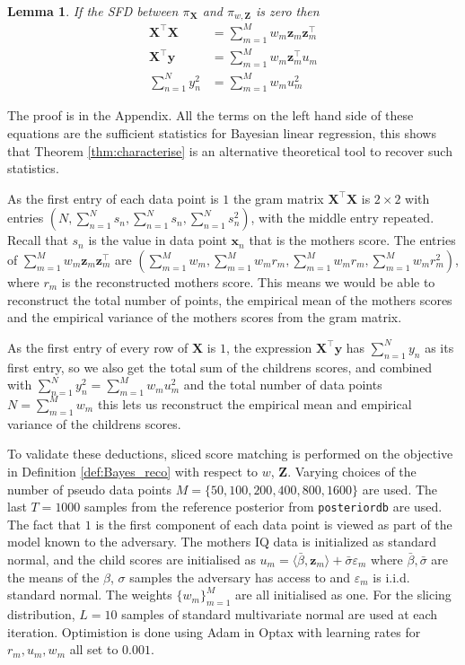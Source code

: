 \documentclass[hyperref]{article}
\theoremstyle{plain}
\newtheorem{lemma}[theorem]{Lemma}
\theoremstyle{remark}
\newcommand{\bx}{\mathbf{x}}
\newcommand{\by}{\mathbf{y}}
\newcommand{\bz}{\mathbf{z}}
\newcommand{\bX}{\mathbf{X}}
\newcommand{\bZ}{\mathbf{Z}}
\begin{document}
\begin{lemma}\label{lem:reco_vals}
	If the \emph{SFD} between $\pi_{\bX}$ and $\pi_{w,\bZ}$ is zero then 
	\begin{align*}
		\bX^{\top}\bX & = \sum_{m=1}^{M}w_{m}\bz_{m}\bz_{m}^{\top} \\
		\bX^{\top}\by & = \sum_{m=1}^{M}w_{m}\bz_{m}^{\top}u_{m} \\
		\sum_{n=1}^{N}y_{n}^{2} & = \sum_{m=1}^{M}w_{m}u_{m}^{2}
	\end{align*}
\end{lemma}

The proof is in the Appendix. All the terms on the left hand side of these equations are the sufficient statistics for Bayesian linear regression, this shows that Theorem \ref{thm:characterise} is an alternative theoretical tool to recover such statistics. 

As the first entry of each data point is $1$ the gram matrix $\bX^{\top}\bX$ is $2\times 2$ with entries $(N,\sum_{n=1}^{N}s_{n},\sum_{n=1}^{N}s_{n},\sum_{n=1}^{N}s_{n}^{2})$, with the middle entry repeated. Recall that $s_{n}$ is the value in data point $\bx_{n}$ that is the mothers score. The entries of $\sum_{m=1}^{M}w_{m}\bz_{m}\bz_{m}^{\top}$ are $(\sum_{m=1}^{M}w_{m}, \sum_{m=1}^{M}w_{m}r_{m},\sum_{m=1}^{M}w_{m}r_{m},\sum_{m=1}^{M}w_{m}r_{m}^{2})$, where $r_{m}$ is the reconstructed mothers score. This means we would be able to reconstruct the total number of points, the empirical mean of the mothers scores and the empirical variance of the mothers scores from the gram matrix.

As the first entry of every row of $\bX$ is $1$, the expression $\bX^{\top}\by$ has $\sum_{n=1}^{N}y_{n}$ as its first entry, so we also get the total sum of the childrens scores, and combined with $\sum_{n=1}^{N}y_{n}^{2} = \sum_{m=1}^{M}w_{m}u_{m}^{2}$ and the total number of data points $N = \sum_{m=1}^{M}w_{m}$ this lets us reconstruct the empirical mean and empirical variance of the childrens scores. 

To validate these deductions, sliced score matching is performed on the objective in Definition \ref{def:Bayes_reco} with respect to $w$, $\bZ$. Varying choices of the number of pseudo data points $M=\{50, 100, 200, 400, 800, 1600\}$ are used. The last $T=1000$ samples from the reference posterior from \texttt{posteriordb} are used. The fact that $1$ is the first component of each data point is viewed as part of the model known to the adversary. The mothers IQ data is initialized as standard normal, and the child scores are initialised as $u_{m} = \langle \bar{\beta},\bz_{m}\rangle + \bar{\sigma}\varepsilon_{m}$ where $\bar{\beta},\bar{\sigma}$ are the means of the $\beta$, $\sigma$ samples the adversary has access to and $\varepsilon_{m}$ is i.i.d. standard normal. The weights $\{w_{m}\}_{m=1}^{M}$ are all initialised as one. For the slicing distribution, $L=10$ samples of standard multivariate normal are used at each iteration. Optimistion is done using Adam in Optax with learning rates for $r_{m},u_{m},w_{m}$ all set to $0.001$.\
\end{document}
